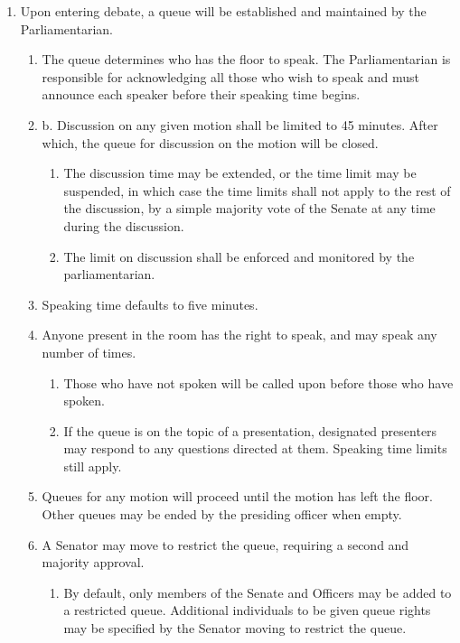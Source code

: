 
\begin{enumerate}
\item Upon entering debate, a queue will be established and maintained by the Parliamentarian.
  \begin{enumerate}
  \item The queue determines who has the floor to speak. The Parliamentarian is responsible for acknowledging all those who wish to speak and must announce each speaker before their speaking time begins.
  \item b. Discussion on any given motion shall be limited to 45 minutes. After which, the queue for discussion on the motion will be closed.
    \begin{enumerate}
    \item The discussion time may be extended, or the time limit may be suspended, in which case the time limits shall not apply to the rest of the discussion, by a simple majority vote of the Senate at any time during the discussion.
    \item The limit on discussion shall be enforced and monitored by the parliamentarian.
    \end{enumerate}
  \item Speaking time defaults to five minutes.
  \item Anyone present in the room has the right to speak, and may speak any number of times.
    \begin{enumerate}
    \item Those who have not spoken will be called upon before those who have spoken.
    \item If the queue is on the topic of a presentation, designated presenters may respond to any questions directed at them. Speaking time limits still apply.
    \end{enumerate}
  \item Queues for any motion will proceed until the motion has left the floor. Other queues may be ended by the presiding officer when empty.
  \item A Senator may move to restrict the queue, requiring a second and majority approval.
    \begin{enumerate}
    \item By default, only members of the Senate and Officers may be added to a restricted queue. Additional individuals to be given queue rights may be specified by the Senator moving to restrict the queue.

\end{enumerate}
\end{enumerate}
\end{enumerate}
